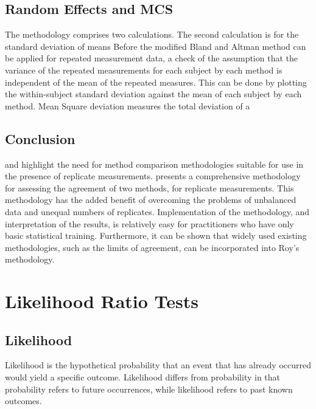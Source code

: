 \documentclass[12pt, a4paper]{report}
\theoremstyle{plain}
\theoremstyle{definition}
\theoremstyle{remark}
\begin{document}



\section{Random Effects and MCS}
The methodology comprises two calculations. The second calculation
is for the standard deviation of means Before the modified Bland
and Altman method can be applied for repeated measurement data, a
check of the assumption that the variance of the repeated
measurements for each subject by each method is independent of the
mean of the repeated measures. This can be done by plotting the
within-subject standard deviation against the mean of each subject
by each method. Mean Square deviation measures the total deviation
of a




\section{Conclusion}
\citet{BXC2008} and \citet{roy} highlight the need for method comparison methodologies suitable for use in the presence of replicate measurements. \citet{roy} presents a comprehensive methodology for assessing the agreement of two methods, for replicate measurements. This methodology has the added benefit of overcoming the problems of unbalanced data and unequal numbers of replicates. Implementation of the methodology, and interpretation of the results, is relatively easy for practitioners who have only basic statistical training. Furthermore, it can be shown that widely used existing methodologies, such as the limits of agreement, can be incorporated into Roy's methodology.


\chapter{Likelihood Ratio Tests}
\section{Likelihood}
Likelihood is the hypothetical probability that an event that has
already occurred would yield a specific outcome. Likelihood
differs from probability in that probability refers to future
occurrences, while likelihood refers to past known outcomes.
\end{document}
